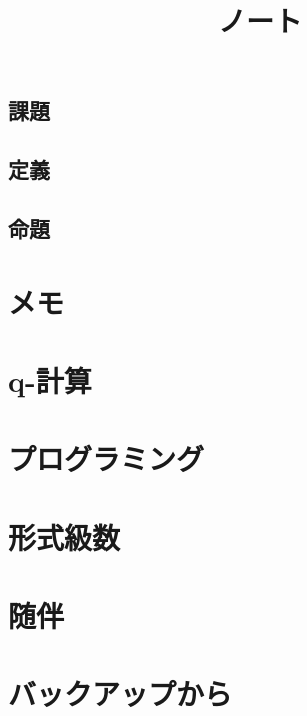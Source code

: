 \documentclass[5pt]{jreport}
\title{ノート}
\author{}
\begin{document}
\maketitle
\tableofcontents
\section*{課題}
\section*{定義}
\section*{命題}

\chapter{メモ}




\chapter{q-計算}

%
\chapter{プログラミング}


\chapter{形式級数}

\chapter{随伴}

\chapter{バックアップから}




\end{document}
